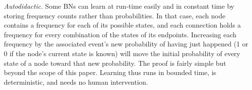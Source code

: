 \documentclass[conference]{IEEEtran}
\begin{document}
	\emph{Autodidactic.} Some BNs can learn at run-time easily and in constant time by storing frequency counts rather than probabilities. In that case, each node contains a frequency for each of its possible states,
and each connection holds a frequency for every combination of the states of its endpoints.
Increasing each frequency
by the associated event's new probability of having just happened (1 or 0 if the node's current state is known)
will move the initial probability of every state of a node toward that new probability. The proof is fairly simple but beyond the scope of this paper. Learning thus runs in bounded time, is deterministic, and needs no human intervention.


\end{document}
